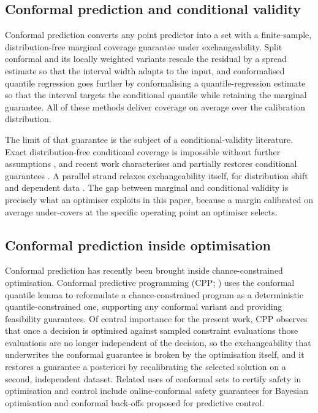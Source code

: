 \subsection{Conformal prediction and conditional validity}

Conformal prediction \citep{vovk2005,angelopoulos2023} converts any point predictor into a
set with a finite-sample, distribution-free marginal coverage guarantee under
exchangeability. Split conformal and its locally weighted variants \citep{lei2018} rescale
the residual by a spread estimate so that the interval width adapts to the input, and
conformalised quantile regression \citep{romano2019} goes further by conformalising a
quantile-regression estimate so that the interval targets the conditional quantile while
retaining the marginal guarantee. All of these methods deliver coverage on average over the
calibration distribution.

The limit of that guarantee is the subject of a conditional-validity literature. Exact
distribution-free conditional coverage is impossible without further assumptions
\citep{vovk2012,leiwasserman2014}, and recent work characterises and partially restores
conditional guarantees \citep{gibbscherian2023}. A parallel strand relaxes exchangeability
itself, for distribution shift and dependent data
\citep{tibshirani2019,barber2023,gibbs2021}. The gap between marginal and conditional
validity is precisely what an optimiser exploits in this paper, because a margin calibrated
on average under-covers at the specific operating point an optimiser selects.

\subsection{Conformal prediction inside optimisation}

Conformal prediction has recently been brought inside chance-constrained optimisation.
Conformal predictive programming (CPP; \citealt{zhao2024cpp}) uses the conformal quantile
lemma to reformulate a chance-constrained program as a deterministic quantile-constrained
one, supporting any conformal variant and providing feasibility guarantees. Of central
importance for the present work, CPP observes that once a decision is optimised against
sampled constraint evaluations those evaluations are no longer independent of the decision,
so the exchangeability that underwrites the conformal guarantee is broken by the optimisation
itself, and it restores a guarantee a posteriori by recalibrating the selected solution on a
second, independent dataset. Related uses of conformal sets to certify safety in optimisation
and control include online-conformal safety guarantees for Bayesian optimisation
\citep{zhang2024} and conformal back-offs proposed for predictive control.

